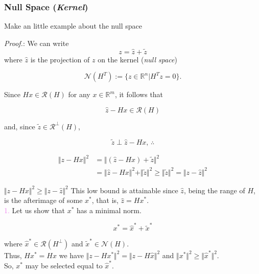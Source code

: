 \documentclass[aspectratio=169]{beamer}
\begin{document}
\begin{frame}
	\frametitle{Null Space (\textit{Kernel})}
	
	Make an little example about the null space
\end{frame}

\begin{frame}{}  %
	
	{\color{violet} \textit{Proof.}:} We can write
		\[ z = \hat{z} + \tilde{z} \]
		\noindent where $\hat{z}$ is the projection of $z$ on the kernel (\textit{null space})
		
		\[\mathcal{N}(H^T) := \{ z\in \mathbb{R}^n | H^T z = 0  \}. \]
		
		Since $Hx \in \mathcal{R}(H) $ for any $x \in \mathbb{R}^m$, it follows that
		
		\[ \hat{z} - Hx \in \mathcal{R}(H) \]
		
		\noindent and, since $\tilde{z} \in \mathcal{R^\perp}(H)$,
		
		\[ \tilde{z} \perp  \hat{z} - Hx, \, \therefore  \]
		

		\begin{align*}
		\Vert z- Hx \Vert^2 &= \Vert (\hat{z}- Hx) + \tilde{z} \Vert^2\\
		&=\Vert \hat{z}- Hx  \Vert^2 + \Vert \tilde{z} \Vert^2 \geq \Vert \tilde{z} \Vert^2 = \Vert z - \hat{z} \Vert^2
		\end{align*}
\end{frame}

\begin{frame}{}  %
	
	$\Vert z- Hx \Vert^2 \geq  \Vert z - \hat{z} \Vert^2$ This low bound is attainable since $\hat{z}$, being the range of $H$, is the afterimage of some $x^\ast$, that is, $\hat{z}= H x^\ast$.\\
	\vspace*{5mm}
	\textcolor{violet}{1.} Let us show that $x^\ast$ has a minimal norm.
	
	\[ x^\ast = \hat{x}^\ast + \tilde{x}^\ast \]
	
	\noindent where $\hat{x}^\ast \in \mathcal{R}(H^\perp)$ and $\tilde{x}^\ast \in \mathcal{N}(H)$.\\
	\vspace*{5mm}	
	Thus, $H x^\ast = H\hat{x}$ we have $\Vert z- Hx^\ast \Vert^2 = \Vert z- H \hat{x} \Vert^2$ and $\Vert x^\ast \Vert^2 \geq \Vert \hat{x}^\ast \Vert^2 $.\\
	\vspace*{5mm}
	{\color{violet} So, $x^\ast$ may be selected equal to $\hat{x}^\ast.$ }
\end{frame}
\end{document}

